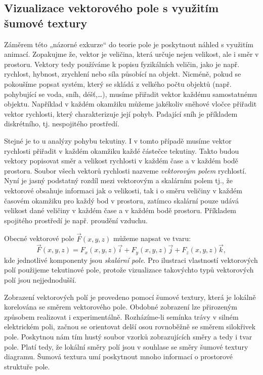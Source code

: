    \subsection{Vizualizace vektorového pole s využitím šumové textury}
      Záměrem této „názorné exkurze“ do teorie pole je poskytnout náhled s využitím animací. 
      Zopakujme že, vektor je veličina, která určuje nejen velikost, ale i směr v prostoru. Vektory 
      tedy používáme k popisu fyzikálních veličin, jako je např. rychlost, hybnost, zrychlení nebo 
      síla působící na objekt. Nicméně, pokud se pokoušíme popsat systém, který se skládá z velkého 
      počtu objektů (např. pohybující se voda, sníh, déšť,…), musíme přiřadit vektor každému 
      samostatnému objektu. Například v každém okamžiku můžeme jakékoliv sněhové vločce přiřadit 
      vektor rychlosti, který charakterizuje její pohyb. Padající sníh je příkladem diskrétního, tj. 
      nespojitého prostředí.    
      
      Stejné je to u analýzy pohybu tekutiny. I v tomto případě musíme vektor rychlosti přiřadit v
      každém okamžiku každé částečce tekutiny. Takto budou vektory popisovat směr a velikost
      rychlosti v každém čase a v každém bodě prostoru. Soubor všech vektorů rychlosti nazveme
      \emph{vektorovým polem} rychlostí. Nyní je jasný podstatný rozdíl mezi vektorovým a skalárním
      polem tj., že vektorové obsahuje informaci jak o velikosti, tak i o směru veličiny v každém
      časovém okamžiku pro každý bod v prostoru, zatímco skalární pouze udává velikost dané veličiny
      v každém čase a v každém bodě prostoru. Příkladem spojitého prostředí je např. proudění
      vzduchu.
      
      Obecné vektorové pole \(\vec{F}(x, y, z)\) můžeme napsat ve tvaru:
      \begin{equation}
        \vec{F}(x,y,z) = F_x(x,y,z)\vec{i} + F_y(x,y,z)\vec{j} + F_z(x,y,z)\vec{k},
      \end{equation} 
      kde jednotlivé komponenty jsou \emph{skalární pole}. Pro ilustraci vlastností vektorových polí 
      použijeme tekutinové pole, protože vizualizace takovýchto typů vektorových polí jsou 
      nejjednodušší.  
      
      Zobrazení vektorových polí je provedeno pomocí šumové textury, která je lokálně korelována se
      směrem vektorového pole. Obdobné zobrazení lze přirozeným způsobem realizovat i
      experimentálně. Rozházíme-li semínka trávy v silném elektrickém poli, začnou se orientovat
      delší osou rovnoběžně se směrem silokřivek pole. Poskytnou nám tím hustý soubor vzorků
      zobrazujících směry a tedy i tvar pole. Platí tedy, že lokální směry polí jsou v souhlase se
      směry šumové textury diagramu. Šumová textura umí poskytnout mnoho informací o prostorové
      struktuře pole.
  
